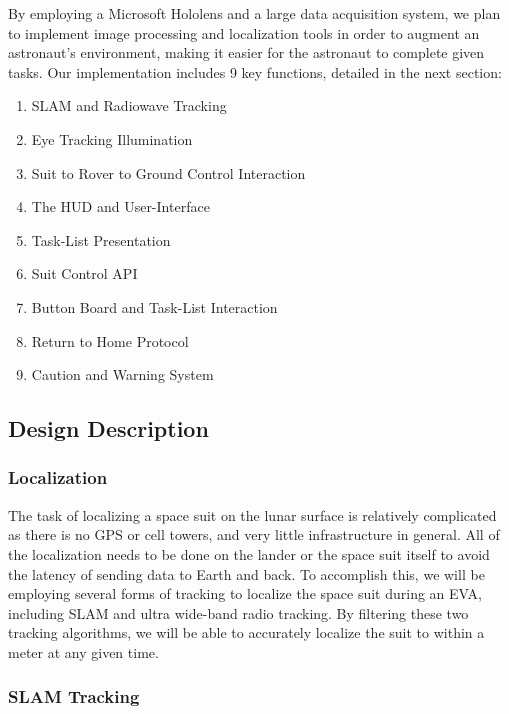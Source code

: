 \documentclass{article}
\let\Oldsubsection\subsection
\renewcommand{\subsection}{\FloatBarrier\Oldsubsection}
\let\Oldsubsubsection\subsubsection
\renewcommand{\subsubsection}{\FloatBarrier\Oldsubsubsection}
\begin{document}
By employing a Microsoft Hololens \autocite{mrbasics} \autocite{mannedspaceflight} and a large data acquisition system, we plan to implement image processing and localization tools in order to augment an astronaut's environment, making it easier for the astronaut to complete given tasks. Our implementation includes 9 key functions, detailed in the next section:

\begin{enumerate}
\item SLAM and Radiowave Tracking
\item Eye Tracking Illumination
\item Suit to Rover to Ground Control Interaction
\item The HUD and User-Interface
\item Task-List Presentation
\item Suit Control API
\item Button Board and Task-List Interaction
\item Return to Home Protocol
\item Caution and Warning System
\end{enumerate}

\subsection{Design Description}

\subsubsection{Localization}

The task of localizing a space suit on the lunar surface is relatively complicated as there is no GPS or cell towers, and very little infrastructure in general. All of the localization needs to be done on the lander or the space suit itself to avoid the latency of sending data to Earth and back. To accomplish this, we will be employing several forms of tracking to localize the space suit during an EVA, including SLAM and ultra wide-band radio tracking. By filtering these two tracking algorithms, we will be able to accurately localize the suit to within a meter at any given time.

\subsubsection{SLAM Tracking}
\end{document}
